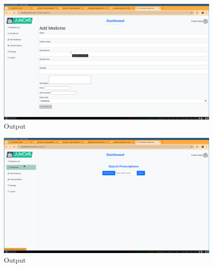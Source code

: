 \documentclass[a4paper,12pt]{article}
\begin{document}
\begin{figure}[H]
    \centering
    \includegraphics[width=1\textwidth]{images/output2.png}
    \caption{Output}
    \label{fig:output2}

\end{figure}
\begin{figure}[H]
    \centering
    \includegraphics[width=1\textwidth]{images/output3.png}
    \caption{Output}
    \label{fig:output3}
\end{figure}
\end{document}
